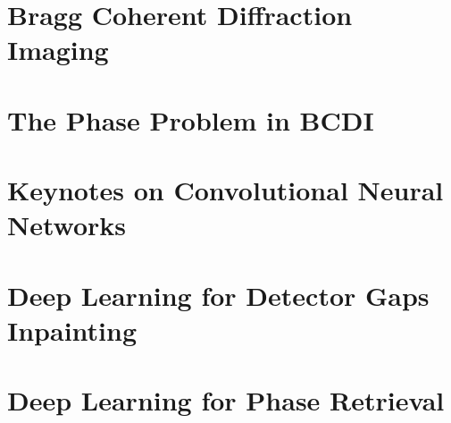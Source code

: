 \documentclass[12pt]{book}
\begin{document}
\mainmatter



\fancyhead[RO]{\leftmark}
\fancyhead[LE]{\textsc{\chaptername~\thechapter}}

\label{chap:introduction}


\chapter{Bragg Coherent Diffraction Imaging}
\label{chap:bcdi}



\chapter{The Phase Problem in BCDI}
\label{chap:phase_problem}


% 

\chapter{Keynotes on Convolutional Neural Networks}
\label{chap:dl_theory}


\chapter{Deep Learning for Detector Gaps Inpainting}
\label{chap:inpainting}


\chapter{Deep Learning for Phase Retrieval}
\label{chap:phase_retrieval}

\end{document}
